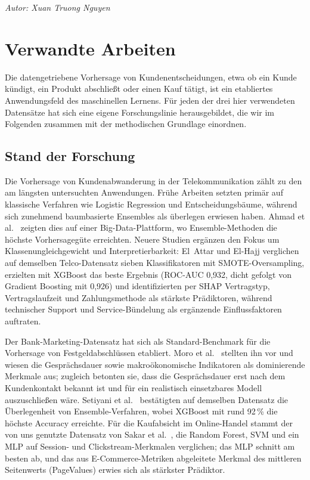 \documentclass[10pt]{scrartcl}
\begin{document}
\begin{flushright}\textit{Autor: Xuan Truong Nguyen}\end{flushright}

\section{Verwandte Arbeiten}
Die datengetriebene Vorhersage von Kundenentscheidungen, etwa ob ein Kunde kündigt, ein Produkt
abschließt oder einen Kauf tätigt, ist ein etabliertes Anwendungsfeld des maschinellen Lernens.
Für jeden der drei hier verwendeten Datensätze hat sich eine eigene Forschungslinie herausgebildet,
die wir im Folgenden zusammen mit der methodischen Grundlage einordnen.

\subsection{Stand der Forschung}
Die Vorhersage von Kundenabwanderung in der Telekommunikation zählt zu den am längsten
untersuchten Anwendungen. Frühe Arbeiten setzten primär auf klassische Verfahren wie Logistic
Regression und Entscheidungsbäume, während sich zunehmend baumbasierte Ensembles als überlegen
erwiesen haben. Ahmad et al.\ \cite{Ahmad2019} zeigten dies auf einer Big-Data-Plattform, wo
Ensemble-Methoden die höchste Vorhersagegüte erreichten. Neuere Studien ergänzen den Fokus um
Klassenungleichgewicht und Interpretierbarkeit: El~Attar und El-Hajj \cite{ElAttar2026}
verglichen auf demselben Telco-Datensatz sieben Klassifikatoren mit SMOTE-Oversampling,
erzielten mit XGBoost das beste Ergebnis (ROC-AUC 0{,}932, dicht gefolgt von Gradient
Boosting mit 0{,}926) und identifizierten per SHAP Vertragstyp, Vertragslaufzeit und
Zahlungsmethode als stärkste Prädiktoren, während technischer Support und
Service-Bündelung als ergänzende Einflussfaktoren auftraten.

Der Bank-Marketing-Datensatz hat sich als Standard-Benchmark für die Vorhersage von
Festgeldabschlüssen etabliert. Moro et al.\ \cite{Moro2014} stellten ihn vor und wiesen die
Gesprächsdauer sowie makroökonomische Indikatoren als dominierende Merkmale aus; zugleich
betonten sie, dass die Gesprächsdauer erst nach dem Kundenkontakt bekannt ist und für ein
realistisch einsetzbares Modell auszuschließen wäre. Setiyani et al.\ \cite{Setiyani2022}
bestätigten auf demselben Datensatz die Überlegenheit von Ensemble-Verfahren, wobei XGBoost mit
rund 92\,\% die höchste Accuracy erreichte. Für die Kaufabsicht im Online-Handel stammt der von
uns genutzte Datensatz von Sakar et al.\ \cite{Sakar2019}, die Random Forest, SVM und ein MLP
auf Session- und Clickstream-Merkmalen verglichen; das MLP schnitt am besten ab, und das aus
E-Commerce-Metriken abgeleitete Merkmal des mittleren Seitenwerts (PageValues) erwies sich als stärkster Prädiktor.
\end{document}

